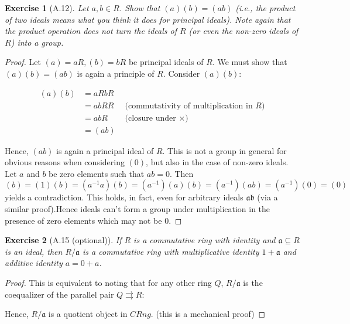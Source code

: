 \documentclass[12pt]{article}
\newtheorem{exercise}{Exercise}
\newcommand{\ia}{\mathfrak{a}}
\newcommand{\ib}{\mathfrak{b}}
\newcommand{\qa}{R/\ia}
\newcommand{\seq}{\subseteq}
\begin{document}
\begin{exercise}[A.12]

Let $a, b \in R$. Show that $(a)(b) = (ab)$ (i.e., the product of two ideals means what you think it does for principal ideals). Note again that the product operation does not turn the ideals of $R$ (or even the non-zero ideals of $R$) into a group.

\end{exercise}

\begin{proof}
	Let $(a) = aR, (b) = bR$ be principal ideals of $R$. We must show that $(a)(b) = (ab)$ is again a principle of $R$. Consider $(a)(b)$: 

\begin{equation*}
	\begin{aligned}
		(a)(b) & = aRbR  \\
			 & = abRR & \text{ (commutativity of multiplication in $R$)}\\
			 & = abR & \text{ (closure under $\times$) } \\
			 & = (ab)
	\end{aligned}
\end{equation*}

Hence, $(ab)$ is again a principal ideal of $R$. This is not a group in general for obvious reasons when considering $(0)$, but also in the case of non-zero ideals. Let $a$ and $b$ be zero elements such that $ab = 0$. Then $(b) = (1)(b) = (a^{-1}a)(b) = (a^{-1})(a)(b) = (a^{-1})(ab) = (a^{-1})(0) = (0)$ yields a contradiction. This holds, in fact, even for arbitrary ideals $\ia\ib$ (via a similar proof).Hence ideals can't form a group under multiplication in the presence of zero elements which may not be 0.  
\end{proof}

\begin{exercise}[A.15 (optional)]
If $R$ is a commutative ring with identity and $\ia \seq R$ is an ideal, then $\qa$ is a commutative ring with multiplicative identity $1 + \ia$ and additive identity $a = 0 + a$.
\end{exercise}

\begin{proof}
	This is equivalent to noting that for any other ring $Q$,  $\qa$ is the coequalizer of the parallel pair $Q \rightrightarrows R$: 
	
	\begin{center}
	\end{center}
Hence, $\qa$ is a quotient object in $CRng$. (this is a mechanical proof)
\end{proof}
\end{document}
